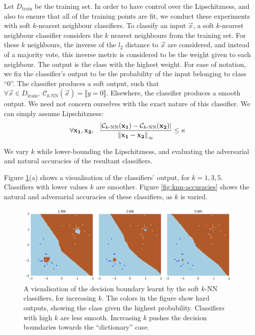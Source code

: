\documentclass{ociamthesis}
\begin{document}
Let $D_\text{train}$ be the training set. In order to have control over the
Lipschitzness, and also to ensure that all of the training points are fit, we
conduct these experiments with soft $k$-nearest neighbour classifiers. To
classify an input $\vec{x}$, a soft $k$-nearest neighbour classifier considers
the $k$ nearest neighbours from the training set. For these $k$ neighbours, the
inverse of the $l_2$ distance to $\vec{x}$ are considered, and instead of a
majority vote, this inverse metric is considered to be the weight given to each
neighbour. The output is the class with the highest weight. For ease of
notation, we fix the classifier's output to be the probability of the input
belonging to class ``0''. The classifier produces a soft output, such that
$\forall \vec{x} \in D_\text{train},~\mathcal{C}_{k\text{-NN}}(\vec{x}) =
\llbracket y = 0 \rrbracket$. Elsewhere, the classifier produces a smooth
output. We need not concern ourselves with the exact nature of this classifier.
We can simply assume Lipschitzness:
\begin{equation*}
    \forall {\mathbf{x_1}}, {\mathbf{x_2}},~~
    \frac{|
        \mathcal{C}_{k\text{-NN}}({\mathbf{x_1}}) - \mathcal{C}_{k\text{-NN}}({\mathbf{x_2}})
    |}{\mathrm{\left\lVert{\mathbf{x_1}} - {\mathbf{x_2}}\right\rVert}_\infty}
    \leq \kappa
\end{equation*}

We vary $k$ while lower-bounding the Lipschitzness, and evaluating the
adversarial and natural accuracies of the resultant classifiers.

Figure \ref{fig:knn-map}(a) shows a visualisation of the classifiers' output,
for $k=1,3,5$. Classifiers with lower values $k$ are smoother. Figure
\ref{fig:knn-accuracies} shows the natural and adversarial accuracies of these
classifiers, as $k$ is varied.

\begin{figure}[!h]
    \centering
    \includegraphics[scale=0.36]{nn-map.png}
    \caption{A visualisation of the decision boundary learnt by the soft $k$-NN
    classifiers, for increasing $k$. The colors in the figure show hard outputs,
    showing the class given the highest probability. Classifiers with high $k$
    are less smooth. Increasing $k$ pushes the decision boundaries towards the
    ``dictionary'' case.}
    \label{fig:knn-map}
\end{figure}
\end{document}
